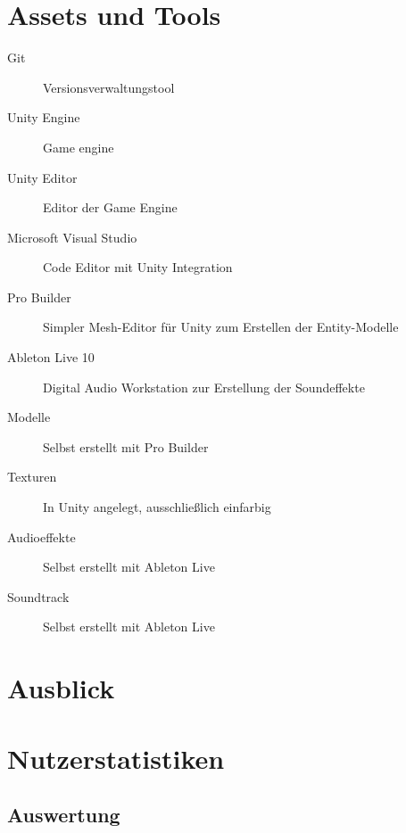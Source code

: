 \documentclass[a4paper,ngerman,12pt]{report}
\begin{document}








\chapter{Assets und Tools}

\begin{description}
\item[Git] Versionsverwaltungstool
\item[Unity Engine] Game engine
\item[Unity Editor] Editor der Game Engine
\item[Microsoft Visual Studio] Code Editor mit Unity Integration
\item[Pro Builder] Simpler Mesh-Editor für Unity zum Erstellen der Entity-Modelle
\item[Ableton Live 10] Digital Audio Workstation zur Erstellung der Soundeffekte
\vspace{5mm}
\item[Modelle] Selbst erstellt mit Pro Builder
\item[Texturen] In Unity angelegt, ausschlie{\ss}lich einfarbig
\item[Audioeffekte] Selbst erstellt mit Ableton Live
\item[Soundtrack] Selbst erstellt mit Ableton Live

\end{description}






\chapter{Ausblick}

\lipsum[3]






\chapter{Nutzerstatistiken}
\label{chapt:PlayerStats}

\lipsum[3]




\section{Auswertung}
\end{document}
